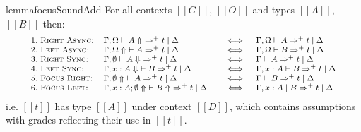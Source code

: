 \begin{restatable}{lemma}{focusSoundAdd}
  \label{lemma:fAddSynthSound}
For all contexts $[[ G ]]$, $[[ O ]]$ and types $[[ A ]]$, $[[ B ]]$
then:
\begin{align*}
  {\footnotesize{
\begin{array}{lll}
 1.\ \textsc{Right Async:} & \Gamma ; \Omega \vdash A \Uparrow\ \Rightarrow^{+} t \mid \Delta \quad &\iff \quad \Gamma, \Omega \vdash A \Rightarrow^{+} t \mid \Delta \\
 2.\ \textsc{Left Async:} & \Gamma ; \Omega \Uparrow\ \vdash A \Rightarrow^{+} t \mid \Delta \quad &\iff \quad \Gamma, \Omega \vdash B \Rightarrow^{+} t \mid \Delta \\
 3.\ \textsc{Right Sync:} & \Gamma ; \emptyset \vdash A \Downarrow\ \Rightarrow^{+} t \mid \Delta  \quad &\iff \quad \Gamma \vdash A \Rightarrow^{+} t \mid \Delta\\
 4.\ \textsc{Left Sync:} & \Gamma ; x : A \Downarrow\ \vdash  B \Rightarrow^{+} t \mid \Delta \quad &\iff \quad \Gamma, x : A \vdash B \Rightarrow^{+} t \mid \Delta \\
 5.\ \textsc{Focus Right:} & \Gamma ; \emptyset \Uparrow\ \vdash A \Rightarrow^{+} t \mid \Delta \quad &\iff \quad \Gamma \vdash B \Rightarrow^{+} t \mid \Delta \\
 6.\ \textsc{Focus Left:} & \Gamma, x : A ; \emptyset \Uparrow\ \vdash B \Uparrow\ \Rightarrow^{+} t \mid \Delta \quad &\iff \quad \Gamma, x : A \mid B \Rightarrow^{+} t \mid \Delta 
\end{array}
  }}
\end{align*}
i.e. $[[ t ]]$ has type $[[ A ]]$
under context $[[ D ]]$,
which contains assumptions with grades reflecting their use in $[[ t ]]$.
\end{restatable}


